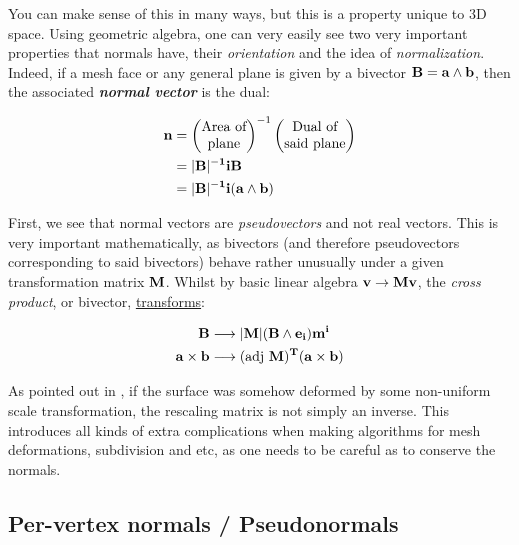 \spa

You can make sense of this in many ways, but this is a property unique to
3D space. Using geometric algebra, one can very easily see two very
important properties that normals have, their \emph{orientation}
and the idea of \emph{normalization}. Indeed, if a mesh face or any general
plane is given by a bivector $\bf{B= a \wedge b}$, then the associated
\emph{\textbf{normal vector}} is the dual:

\begin{align*}
    \bf{n} &= \begin{pmatrix}
\text{Area of} \\
\text{plane}
\end{pmatrix}^{-1}
\begin{pmatrix}
\text{Dual of} \\
\text{said plane}
\end{pmatrix} \\
    &= |\bf{B}|^{-1} i\bf{B} \\
    &= |\bf{B}|^{-1} i(\bf{a \wedge b}) \\
\end{align*}

\spa

First, we see that normal vectors are \emph{pseudovectors} and not
real vectors. This is very important mathematically, as bivectors
(and therefore pseudovectors corresponding to said bivectors) behave
rather unusually under a given transformation matrix $\bf{M}$.
Whilst by basic linear algebra $\bf{v \rightarrow Mv}$, the
\emph{cross product}, or bivector, 
\href{https://peeterjoot.com/2024/01/21/bivector-transformation-and-reciprocal-frame-for-column-vectors-of-a-transformation/}{transforms}:

\begin{align*}
\bf{B} &\longrightarrow |\bf{M}| \bf{(B\wedge e_i) m^i} \\
 \bf{a \times b} &\longrightarrow (\text{adj } \bf{M})^T (\bf{a \times b})
\end{align*}

As pointed out in \cite{graphicscompendium},
if the surface was somehow deformed by some non-uniform scale transformation,
the rescaling matrix is not simply an inverse. This introduces all kinds
of extra complications when making algorithms for mesh deformations,
subdivision and etc, as one needs to be careful as to conserve the normals.

\subsection{Per-vertex normals / Pseudonormals} \label{per-vertex-normals}

